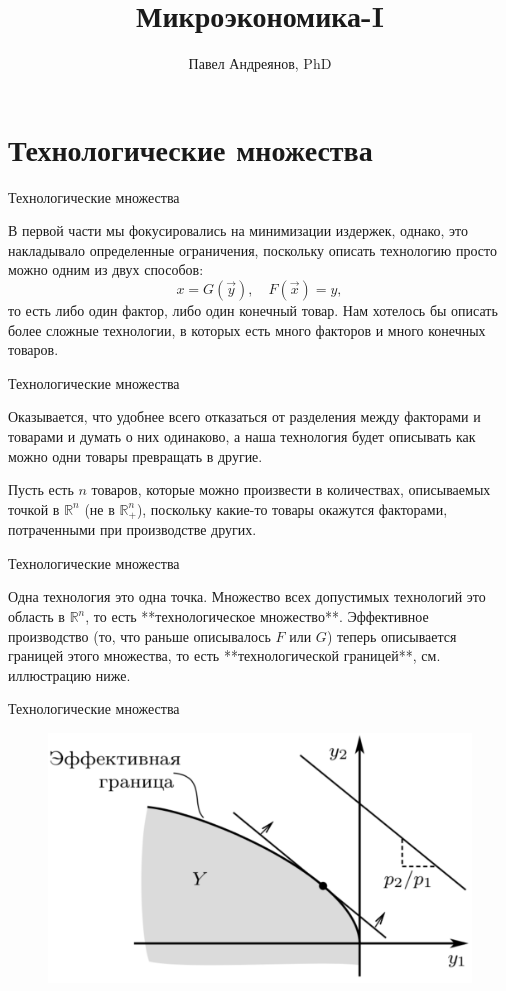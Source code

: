 \documentclass{beamer}
\title{
Микроэкономика-I
}
\author{
Павел Андреянов, PhD
}
\begin{document}
\maketitle

\section{Технологические множества}

\begin{frame}{Технологические множества}

В первой части мы фокусировались на минимизации издержек, однако, это накладывало определенные ограничения, поскольку описать технологию просто можно одним из двух способов:
$$ x = G(\vec y), \quad F(\vec x) = y,$$
то есть либо один фактор, либо один конечный товар. Нам хотелось бы описать более сложные технологии, в которых есть много факторов и много конечных товаров.

\end{frame}

\begin{frame}{Технологические множества}

Оказывается, что удобнее всего отказаться от разделения между факторами и товарами и думать о них одинаково, а наша технология будет описывать как можно одни товары превращать в другие.

Пусть есть $n$ товаров, которые можно произвести в количествах, описываемых точкой в $\mathbb{R}^n$ (не в $\mathbb{R}^n_+$), поскольку какие-то товары окажутся факторами, потраченными при производстве других. 

\end{frame}

\begin{frame}{Технологические множества}

Одна технология это одна точка. Множество всех допустимых технологий это область в $\mathbb{R}^n$, то есть **технологическое множество**. Эффективное производство (то, что раньше описывалось $F$ или $G$) теперь описывается границей этого множества, то есть **технологической границей**, см. иллюстрацию ниже.

\end{frame}

\begin{frame}{Технологические множества}

\begin{figure}[hbt]
\centering
\includegraphics[width=.8 \textwidth]{prod_set.png}
\end{figure}

\end{frame}
\end{document}
